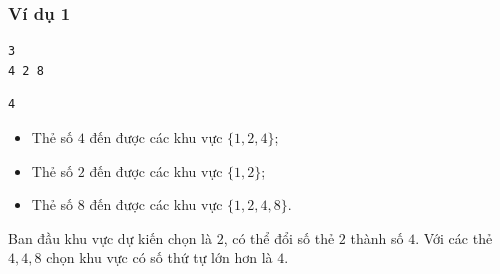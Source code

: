 \subsubsection*{Ví dụ 1}
\begin{makesample}
\begin{lstlisting}
3
4 2 8
\end{lstlisting}
\nextsample
\begin{lstlisting}
4
\end{lstlisting}
\end{makesample}

\begin{explain}
\begin{itemize}
    \item Thẻ số $4$ đến được các khu vực $\{1,2,4\}$;
    \item Thẻ số $2$ đến được các khu vực $\{1,2\}$;
    \item Thẻ số $8$ đến được các khu vực $\{1,2,4,8\}$.
\end{itemize}

Ban đầu khu vực dự kiến chọn là $2$, có thể đổi số thẻ $2$ thành số $4$. Với các thẻ $4,4,8$ chọn khu vực có số thứ tự lớn hơn là $4$. 
\end{explain}
